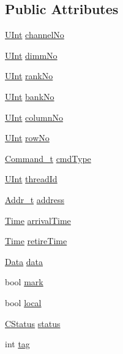 \subsection*{Public Attributes}
\begin{CompactItemize}
\item 
\hyperlink{constants_8h_ba0996d26f7be2572973245b51852757}{UInt} \hyperlink{classRequest_08d39ad8a398f52881062f2adf382b54}{channelNo}
\item 
\hyperlink{constants_8h_ba0996d26f7be2572973245b51852757}{UInt} \hyperlink{classRequest_a6ed35e2f31c770e83522693588d14e6}{dimmNo}
\item 
\hyperlink{constants_8h_ba0996d26f7be2572973245b51852757}{UInt} \hyperlink{classRequest_bddc8747193b271e09d39ccb25b92eab}{rankNo}
\item 
\hyperlink{constants_8h_ba0996d26f7be2572973245b51852757}{UInt} \hyperlink{classRequest_703b9a601c28bf6c8f77793c886de6ef}{bankNo}
\item 
\hyperlink{constants_8h_ba0996d26f7be2572973245b51852757}{UInt} \hyperlink{classRequest_ea33fdb59b3e5316550b7099960d6853}{columnNo}
\item 
\hyperlink{constants_8h_ba0996d26f7be2572973245b51852757}{UInt} \hyperlink{classRequest_b0efa75eb0e590f70511a47e22e0c3a6}{rowNo}
\item 
\hyperlink{request_8h_fe8d33d42ee3ed4867090180ef38afbd}{Command\_\-t} \hyperlink{classRequest_593211244840b4eca9849fd3682c4d8c}{cmdType}
\item 
\hyperlink{constants_8h_ba0996d26f7be2572973245b51852757}{UInt} \hyperlink{classRequest_a828a07438920f87df95ab6b795f39fa}{threadId}
\item 
\hyperlink{constants_8h_51badf0ffa6471a1e529c69852e56f57}{Addr\_\-t} \hyperlink{classRequest_0fd64e90be9318a9d1e81f7a70a6eefb}{address}
\item 
\hyperlink{constants_8h_a475e5c84e5eb0fe317942dc62553f7e}{Time} \hyperlink{classRequest_9f6f38ad1672f894e403201fff2d43dc}{arrivalTime}
\item 
\hyperlink{constants_8h_a475e5c84e5eb0fe317942dc62553f7e}{Time} \hyperlink{classRequest_93a4e7aa5109ed4e89dac4d8a02822eb}{retireTime}
\item 
\hyperlink{structData}{Data} \hyperlink{classRequest_3959d503ec310ffa3782619c71de7218}{data}
\item 
bool \hyperlink{classRequest_dc0aa0901f3ce0be6a749f54508460c5}{mark}
\item 
bool \hyperlink{classRequest_acec648b31680354c6968feae321f875}{local}
\item 
\hyperlink{request_8h_8d135869d04d8d8c55c0e45752845cf0}{CStatus} \hyperlink{classRequest_48599e50c349bc0a36d886a24a7e578e}{status}
\item 
int \hyperlink{classRequest_49202d5503dd1922eacac0c589f766a9}{tag}
\end{CompactItemize}


